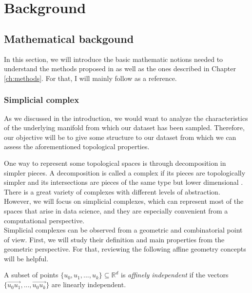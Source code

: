 \documentclass[../main.tex]{subfiles}
\begin{document}
\chapter{Background}
\label{ch:background}

\section{Mathematical backgound}
\label{sec:tda}
In this section, we will introduce the basic mathematic notions needed to understand the methods proposed in \cite{hofer_densified_2021, moschella_relative_2022} as well as the ones described in Chapter \ref{ch:methods}.  For that, I will mainly follow \cite{edelsbrunner_computational_2010}  as a reference.

\subsection{Simplicial complex}
As we discussed in the introduction, we would want to analyze the characteristics of the underlying manifold from which our dataset has been sampled. Therefore, our objective will be to give some structure to our dataset from which we can assess the aforementioned topological properties.

One way to represent some topological spaces is through decomposition in simpler pieces. A decomposition is called a complex if its pieces are topologically simpler and its intersections are pieces of the same type but lower dimensional \cite{edelsbrunner_computational_2010}. There is a great variety of complexes with different levels of abstraction. However, we will focus on simplicial complexes, which can represent most of the spaces that arise in data science, and they are especially convenient from a computational perspective.\\

Simplicial complexes can be observed from a geometric and combinatorial point of view. First, we will study their definition and main properties from the geometric perspective. For that, reviewing the following affine geometry concepts will be helpful. 

\begin{definition}
A subset of points $\{u_0, u_1, ..., u_k\} \subseteq \mathbb{R}^d$ is \emph{affinely independent} if the vectors $\{\overrightarrow{u_0u_1}, ..., \overrightarrow{u_0u_k}\}$ are linearly independent.
\end{definition}
\end{document}
